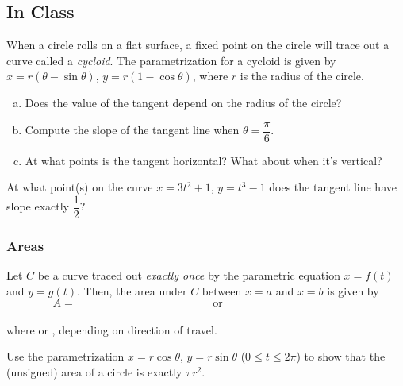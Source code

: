 \documentclass[notes]{subfiles}
\begin{document}
	\subsection*{In Class}
		
		\begin{ex}
			When a circle rolls on a flat surface, a fixed point on the circle will trace out a curve called a \emph{cycloid}.  The parametrization for a cycloid is given by $x = r(\theta - \sin\theta)$, $y = r(1-\cos\theta)$, where $r$ is the radius of the circle.  
			\begin{enumerate}[(a)]
				\item Does the value of the tangent depend on the radius of the circle?
					
				\item Compute the slope of the tangent line when $\theta = \dfrac{\pi}{6}$.
					
				\item At what points is the tangent horizontal?  What about when it's vertical?
			\end{enumerate}
		\end{ex}
		
		\begin{ex}
			At what point(s) on the curve $x = 3t^2 +1$, $y = t^3-1$ does the tangent line have slope exactly $\dfrac{1}{2}$?
		\end{ex}
			\vs{1}
			\newpage
			
	\subsubsection*{Areas}
		\begin{rmk}
			Let $C$ be a curve traced out \emph{exactly once} by the parametric equation $x = f(t)$ and $y = g(t)$.  Then, the area under $C$ between $x = a$ and $x = b$ is given by \\
				\[A = \hspace{2in}\text{ or }\hspace{2in} \] \\[40pt]
			where \blank{2} or , depending on direction of travel.
		\end{rmk}
		\begin{pf}
			
		\end{pf}	
			\vspace{1.5in}
			
		\begin{ex}
			Use the parametrization $x = r\cos\theta$, $y = r\sin\theta$ ($0\leq t\leq 2\pi$) to show that the (unsigned) area of a circle is exactly $\pi r^2$.
		\end{ex}
			
\end{document}

